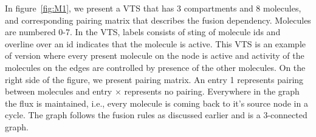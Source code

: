\begin{example}
%
In figure~\ref{fig:M1}, we present a VTS that has 3
compartments and 8 molecules, and corresponding pairing matrix that
describes the fusion dependency.
%
Molecules are numbered 0-7.
%
In the VTS, labels consists of sting of molecule ids and overline
over an id indicates that the molecule is active.
%
This VTS is an example of version where every present molecule on
the node is active and activity of the molecules on the
edges are controlled by presence of the other molecules.
%
On the right side of the figure, we present pairing matrix.
%
An entry 1 represents pairing between molecules and
entry $\times$ represents no pairing.
%
Everywhere in the graph the flux is maintained, i.e.,
every molecule is coming back to it's source node in a cycle.
%
The graph follows the fusion rules as discussed earlier and
is a 3-connected graph.
\end{example}



